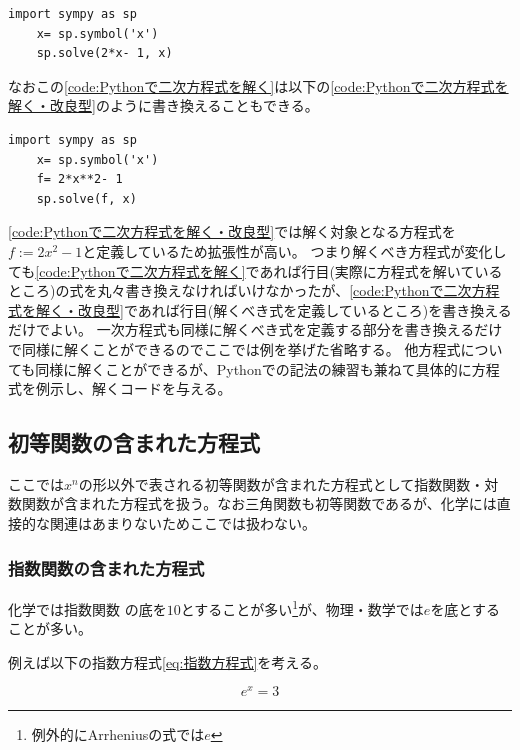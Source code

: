 \documentclass[dvipdfmx, leqno]{jsreport}
\begin{document}
\begin{lstlisting}[caption= {Pythonで二次方程式を解く}, label={code:Pythonで二次方程式を解く}]
    import sympy as sp
    x= sp.symbol('x')
    sp.solve(2*x- 1, x)
\end{lstlisting}
    なおこの\cref{code:Pythonで二次方程式を解く}は以下の\cref{code:Pythonで二次方程式を解く・改良型}のように書き換えることもできる。
\begin{lstlisting}[caption= {Pythonで二次方程式を解く・改良型}, label= {code:Pythonで二次方程式を解く・改良型}]
    import sympy as sp
    x= sp.symbol('x')
    f= 2*x**2- 1
    sp.solve(f, x)
\end{lstlisting}
    \cref{code:Pythonで二次方程式を解く・改良型}では解く対象となる方程式を$f:=2x^2- 1$と定義しているため拡張性が高い。
    つまり解くべき方程式が変化しても\cref{code:Pythonで二次方程式を解く}であれば行目(実際に方程式を解いているところ)の式を丸々書き換えなければいけなかったが、\cref{code:Pythonで二次方程式を解く・改良型}であれば行目(解くべき式を定義しているところ)を書き換えるだけでよい。
    一次方程式も同様に解くべき式を定義する部分を書き換えるだけで同様に解くことができるのでここでは例を挙げた省略する。
    他方程式についても同様に解くことができるが、Pythonでの記法の練習も兼ねて具体的に方程式を例示し、解くコードを与える。

\subsection{初等関数の含まれた方程式}
    ここでは$x^n$の形以外で表される初等関数が含まれた方程式として指数関数・対数関数が含まれた方程式を扱う。なお三角関数も初等関数であるが、化学には直接的な関連はあまりないためここでは扱わない。

\subsubsection{指数関数の含まれた方程式}
    化学では指数関数%
    の底を$10$とすることが多い\footnote{例外的にArrheniusの式では$e$}が、物理・数学では$e$を底とすることが多い。

    例えば以下の指数方程式\eqref{eq:指数方程式}を考える。
\begin{tcolorbox}
\begin{equation}\label{eq:指数方程式}
    e^x= 3
\end{equation}
\end{tcolorbox}
\end{document}

